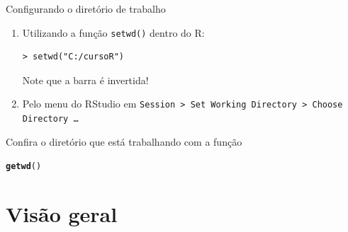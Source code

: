 \documentclass[10pt,handout]{beamer}\usepackage[]{graphicx}\usepackage[]{color}
\makeatletter
\newcommand{\hlstd}[1]{\textcolor[rgb]{0.345,0.345,0.345}{#1}}%
\newcommand{\hlkwd}[1]{\textcolor[rgb]{0.737,0.353,0.396}{\textbf{#1}}}%
\newenvironment{kframe}{%
 \def\at@end@of@kframe{}%
 \ifinner\ifhmode%
  \def\at@end@of@kframe{\end{minipage}}%
  \begin{minipage}{\columnwidth}%
 \fi\fi%
 \def\FrameCommand##1{\hskip\@totalleftmargin \hskip-\fboxsep
 \colorbox{shadecolor}{##1}\hskip-\fboxsep
     \hskip-\linewidth \hskip-\@totalleftmargin \hskip\columnwidth}%
 \MakeFramed {\advance\hsize-\width
   \@totalleftmargin\z@ \linewidth\hsize
   \@setminipage}}%
 {\par\unskip\endMakeFramed%
 \at@end@of@kframe}
\newenvironment{knitrout}{}{} %
\makeatother
\begin{document}
\begin{frame}[fragile]{Configurando o diretório de trabalho}
\begin{enumerate}
\item Utilizando a função \texttt{setwd()} dentro do R:
\begin{verbatim}
> setwd("C:/cursoR")
\end{verbatim}
Note que a barra é invertida!
\item Pelo menu do RStudio em \texttt{Session > Set Working Directory >
  Choose Directory \ldots}
\end{enumerate}
Confira o diretório que está trabalhando com a função
\begin{knitrout}\small
{}\color{fgcolor}\begin{kframe}
\begin{alltt}
\hlkwd{getwd}\hlstd{()}
\end{alltt}
\end{kframe}
\end{knitrout}
\end{frame}

\section{Visão geral}

\end{document}
